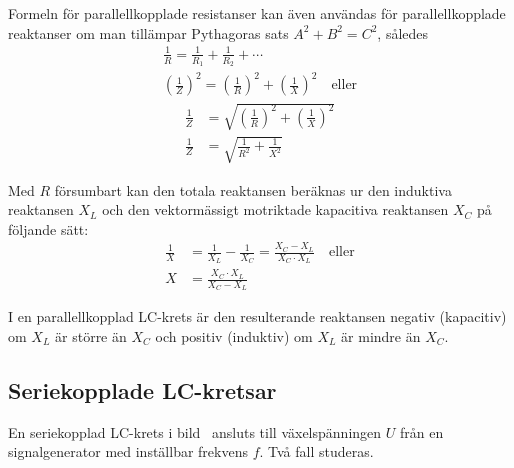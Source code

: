 \begin{description}
Formeln för parallellkopplade resistanser kan även användas för
parallellkopplade reaktanser om man tillämpar Pythagoras sats
\(A^2 + B^2 = C^2\), således
%
\begin{gather*}
	\frac{1}{R} = \frac{1}{R_1} + \frac{1}{R_2} + \cdots \\
	\left(\frac{1}{Z}\right)^2 = \left(\frac{1}{R}\right)^2 +
	\left(\frac{1}{X}\right)^2 \quad \text{eller}
\end{gather*}
\begin{align*}
	\frac{1}{Z} &= \sqrt{\left(\frac{1}{R}\right)^2 + \left(\frac{1}{X}\right)^2} \\
	\frac{1}{Z} &= \sqrt{\frac{1}{R^2} + \frac{1}{X^2}}
\end{align*}

Med \(R\) försumbart kan den totala reaktansen beräknas ur den induktiva reaktansen \(X_L\)
och den vektormässigt motriktade kapacitiva reaktansen \(X_C\) på följande sätt:
%
\begin{align*}
	\frac{1}{X} &= \frac{1}{X_L} - \frac{1}{X_C} = \frac{X_C - X_L}{X_C \cdot X_L}
	\quad \text{eller} \\
	X &= \frac{X_C \cdot X_L}{X_C - X_L}
\end{align*}

I en parallellkopplad LC-krets är den resulterande reaktansen negativ
(kapacitiv) om \(X_L\) är större än \(X_C\) och positiv (induktiv) om \(X_L\) är
mindre än \(X_C\).
\end{description}

\subsection{Seriekopplade LC-kretsar}


En seriekopplad LC-krets i bild~ ansluts till
växelspänningen \(U\) från en signalgenerator med inställbar frekvens \(f\).
Två fall studeras.

